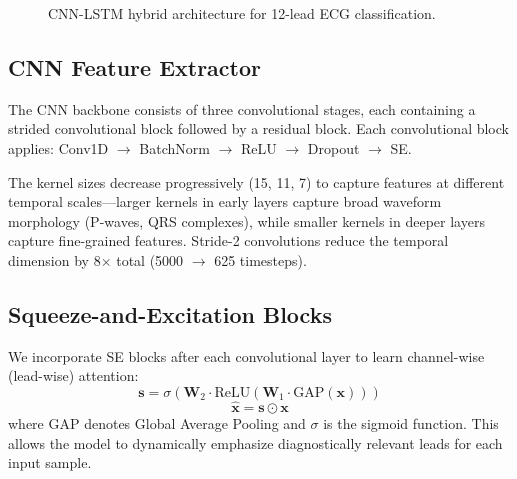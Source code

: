 \documentclass[conference]{IEEEtran}
\begin{document}
\begin{figure}[htbp]
\centering
{}
\caption{CNN-LSTM hybrid architecture for 12-lead ECG classification.}
\label{fig:architecture}
\end{figure}

\subsection{CNN Feature Extractor}

The CNN backbone consists of three convolutional stages, each containing a strided convolutional block followed by a residual block. Each convolutional block applies: Conv1D $\to$ BatchNorm $\to$ ReLU $\to$ Dropout $\to$ SE.

The kernel sizes decrease progressively (15, 11, 7) to capture features at different temporal scales---larger kernels in early layers capture broad waveform morphology (P-waves, QRS complexes), while smaller kernels in deeper layers capture fine-grained features. Stride-2 convolutions reduce the temporal dimension by 8$\times$ total (5000 $\to$ 625 timesteps).

\subsection{Squeeze-and-Excitation Blocks}

We incorporate SE blocks \cite{hu2018squeeze} after each convolutional layer to learn channel-wise (lead-wise) attention:
\begin{equation}
    \mathbf{s} = \sigma(\mathbf{W}_2 \cdot \text{ReLU}(\mathbf{W}_1 \cdot \text{GAP}(\mathbf{x})))
\end{equation}
\begin{equation}
    \hat{\mathbf{x}} = \mathbf{s} \odot \mathbf{x}
\end{equation}
where GAP denotes Global Average Pooling and $\sigma$ is the sigmoid function. This allows the model to dynamically emphasize diagnostically relevant leads for each input sample.
\end{document}
